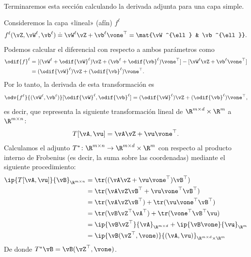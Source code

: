 \documentclass[../../book-main_es.tex]{subfiles}
\begin{document}
Terminaremos esta sección calculando la derivada adjunta para una
capa simple.
\begin{example}
    Consideremos la capa «lineal» (afín) \(f^{\ell}\)
    \begin{equation}
        f^{\ell}(\vZ, \vW^{\ell}, \vb^{\ell}) \doteq \vW^{\ell}\vZ +
        \vb^{\ell}\vone^{\top} = \mat{\vW^{\ell} & \vb^{\ell}}.
    \end{equation}
    Podemos calcular el diferencial con respecto a ambos parámetros como
    \begin{align}
        \odif{f}^{\ell}
        &= [(\vW^{\ell} + \odif{\vW}^{\ell})\vZ + (\vb^{\ell} +
        \odif{\vb}^{\ell})\vone^{\top}] - [\vW^{\ell}\vZ + \vb^{\ell}\vone^{\top}] \\
        &= (\odif{\vW}^{\ell})\vZ + (\odif{\vb}^{\ell})\vone^{\top}.
    \end{align}
    Por lo tanto, la derivada de esta transformación es
    \begin{equation}
        \odv{f^{\ell}}{(\vW^{\ell}, \vb^{\ell})}[\odif{\vW}^{\ell},
        \odif{\vb}^{\ell}] = (\odif{\vW}^{\ell})\vZ +
        (\odif{\vb}^{\ell})\vone^{\top},
    \end{equation}
    es decir, que representa la siguiente transformación lineal de
    \(\R^{m \times d} \times \R^{m}\) a \(\R^{m \times n}\):
    \begin{equation}
        T[\vA, \vu] = \vA\vZ + \vu\vone^{\top}.
    \end{equation}
    Calculamos el adjunto \(T^{*} \colon \R^{m \times n} \to \R^{m
    \times d} \times \R^{m}\) con respecto al producto interno de Frobenius
    (es decir, la suma sobre las coordenadas) mediante el siguiente procedimiento:
    \begin{align}
        \ip{T[\vA, \vu]}{\vB}_{\R^{m \times n}}
        &= \tr((\vA\vZ + \vu\vone^{\top})\vB^{\top}) \\
        &= \tr(\vA\vZ\vB^{\top} + \vu\vone^{\top}\vB^{\top}) \\
        &= \tr(\vA\vZ\vB^{\top}) + \tr(\vu\vone^{\top}\vB^{\top}) \\
        &= \tr(\vB\vZ^{\top}\vA^{\top}) + \tr(\vone^{\top}\vB^{\top}\vu) \\
        &= \ip{\vB\vZ^{\top}}{\vA}_{\R^{m \times d}} +
        \ip{\vB\vone}{\vu}_{\R^{m}} \\
        &= \ip{\vB(\vZ^{\top}, \vone)}{(\vA, \vu)}_{\R^{m \times d}
        \times \R^{m}}
    \end{align}
    De donde \(T^{*}\vB = \vB(\vZ^{\top}, \vone)\).
\end{example}
\end{document}
